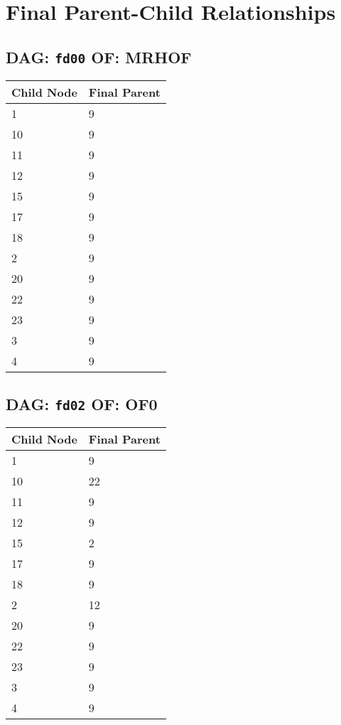 \documentclass{article}
\begin{document}
\pagestyle{fancy}
\fancyhf{}
\section*{Final Parent-Child Relationships}
\subsection*{DAG: \texttt{fd00} OF: MRHOF}
\begin{tabular}{ll}
\toprule
\textbf{Child Node} & \textbf{Final Parent} \\
\midrule
1 & 9 \\
10 & 9 \\
11 & 9 \\
12 & 9 \\
15 & 9 \\
17 & 9 \\
18 & 9 \\
2 & 9 \\
20 & 9 \\
22 & 9 \\
23 & 9 \\
3 & 9 \\
4 & 9 \\
\bottomrule
\end{tabular}

\subsection*{DAG: \texttt{fd02} OF: OF0}
\begin{tabular}{ll}
\toprule
\textbf{Child Node} & \textbf{Final Parent} \\
\midrule
1 & 9 \\
10 & 22 \\
11 & 9 \\
12 & 9 \\
15 & 2 \\
17 & 9 \\
18 & 9 \\
2 & 12 \\
20 & 9 \\
22 & 9 \\
23 & 9 \\
3 & 9 \\
4 & 9 \\
\bottomrule
\end{tabular}
\end{document}
